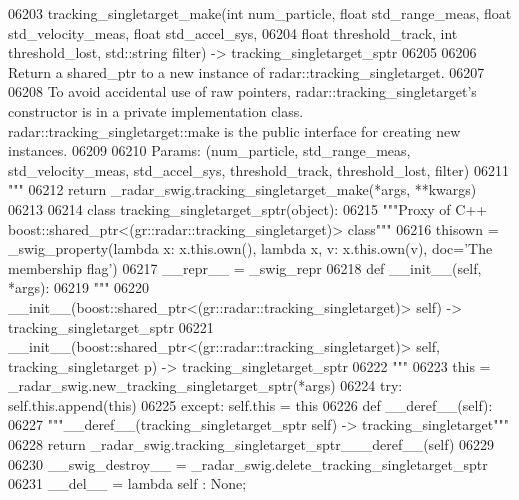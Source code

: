 \begin{DoxyCode}
{{{{{{{{{{{{{{{{{{{{{06203 \textcolor{stringliteral}{    tracking\_singletarget\_make(int num\_particle, float std\_range\_meas, float std\_velocity\_meas, float
       std\_accel\_sys, }
06204 \textcolor{stringliteral}{        float threshold\_track, int threshold\_lost, std::string filter) -> tracking\_singletarget\_sptr}
06205 \textcolor{stringliteral}{}
06206 \textcolor{stringliteral}{    Return a shared\_ptr to a new instance of radar::tracking\_singletarget.}
06207 \textcolor{stringliteral}{}
06208 \textcolor{stringliteral}{    To avoid accidental use of raw pointers, radar::tracking\_singletarget's constructor is in a private
       implementation class. radar::tracking\_singletarget::make is the public interface for creating new instances.}
06209 \textcolor{stringliteral}{}
06210 \textcolor{stringliteral}{    Params: (num\_particle, std\_range\_meas, std\_velocity\_meas, std\_accel\_sys, threshold\_track,
       threshold\_lost, filter)}
06211 \textcolor{stringliteral}{    """}
06212   \textcolor{keywordflow}{return} \_radar\_swig.tracking\_singletarget\_make(*args, **kwargs)
06213 
06214 \textcolor{keyword}{class }tracking_singletarget_sptr(object):
06215     \textcolor{stringliteral}{"""Proxy of C++ boost::shared\_ptr<(gr::radar::tracking\_singletarget)> class"""}
06216     thisown = _swig_property(\textcolor{keyword}{lambda} x: x.this.own(), \textcolor{keyword}{lambda} x, v: x.this.own(v), doc=\textcolor{stringliteral}{'The membership flag'})
06217     \_\_repr\_\_ = \_swig\_repr
06218     \textcolor{keyword}{def }__init__(self, *args): 
06219         \textcolor{stringliteral}{"""}
06220 \textcolor{stringliteral}{        \_\_init\_\_(boost::shared\_ptr<(gr::radar::tracking\_singletarget)> self) -> tracking\_singletarget\_sptr}
06221 \textcolor{stringliteral}{        \_\_init\_\_(boost::shared\_ptr<(gr::radar::tracking\_singletarget)> self, tracking\_singletarget p) ->
       tracking\_singletarget\_sptr}
06222 \textcolor{stringliteral}{        """}
06223         this = \_radar\_swig.new\_tracking\_singletarget\_sptr(*args)
06224         \textcolor{keywordflow}{try}: self.this.append(this)
06225         \textcolor{keywordflow}{except}: self.this = this
06226     \textcolor{keyword}{def }__deref__(self):
06227         \textcolor{stringliteral}{"""\_\_deref\_\_(tracking\_singletarget\_sptr self) -> tracking\_singletarget"""}
06228         \textcolor{keywordflow}{return} \_radar\_swig.tracking\_singletarget\_sptr\_\_\_deref\_\_(self)
06229 
06230     \_\_swig\_destroy\_\_ = \_radar\_swig.delete\_tracking\_singletarget\_sptr
06231     \_\_del\_\_ = \textcolor{keyword}{lambda} self : \textcolor{keywordtype}{None};
}}}}}}}}}}}}}}}}}}}}}
\end{DoxyCode}
